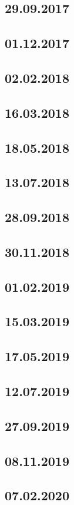 \documentclass[a4paper,12p]{article}
\begin{document}
	\subsection{29.09.2017}
	\subsection{01.12.2017}
	\subsection{02.02.2018}
	\subsection{16.03.2018}
	\subsection{18.05.2018}
	\subsection{13.07.2018}
	\subsection{28.09.2018}
	\subsection{30.11.2018}
	\subsection{01.02.2019}
	
	\newpage
	\subsection{15.03.2019}
		
	
	
	\newpage	
	\subsection{17.05.2019}
	
	
	\newpage
	\subsection{12.07.2019}
	
	
	
	
	
	\newpage
	\subsection{27.09.2019}
	\subsection{08.11.2019}
	\subsection{07.02.2020}
\end{document}
